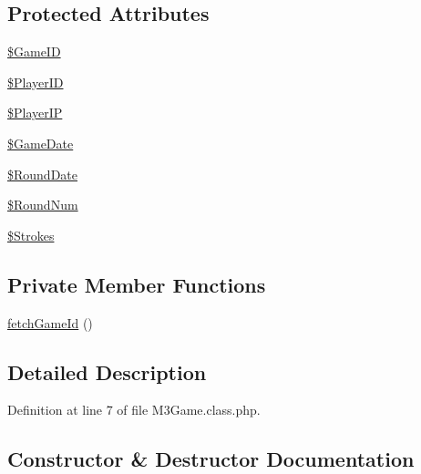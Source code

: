 \subsection*{Protected Attributes}
\begin{DoxyCompactItemize}
\item 
\hyperlink{class_m3_game_a9bb1d83064b5c9193d5d01c2919b4ce4}{\$\+Game\+ID}
\item 
\hyperlink{class_m3_game_a2dd2bab0e9b24e4eac6a3740bd8a5dfc}{\$\+Player\+ID}
\item 
\hyperlink{class_m3_game_ae6cb684233a588d71a74898b7b968574}{\$\+Player\+IP}
\item 
\hyperlink{class_m3_game_a49d4459112fafab3817c95969587220b}{\$\+Game\+Date}
\item 
\hyperlink{class_m3_game_a604ce7aab65292064d0e781f52cd7cf6}{\$\+Round\+Date}
\item 
\hyperlink{class_m3_game_ac465bad6ae1e4f6ce8385d5778c882b0}{\$\+Round\+Num}
\item 
\hyperlink{class_m3_game_aaf03b510200a259c6fe81ea59dd76e2d}{\$\+Strokes}
\end{DoxyCompactItemize}
\subsection*{Private Member Functions}
\begin{DoxyCompactItemize}
\item 
\hyperlink{class_m3_game_aade0085d4c6ad8e99e1f60886029f63a}{fetch\+Game\+Id} ()
\end{DoxyCompactItemize}


\subsection{Detailed Description}


Definition at line 7 of file M3\+Game.\+class.\+php.



\subsection{Constructor \& Destructor Documentation}
\mbox{\label{class_m3_game_a0a95aa60413fd78db8b25f2ff6b0e885}} 
